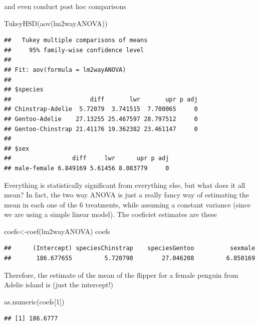 \documentclass[
]{book}
\newenvironment{Shaded}{\begin{snugshade}}{\end{snugshade}}
\newcommand{\DecValTok}[1]{\textcolor[rgb]{0.00,0.00,0.81}{#1}}
\newcommand{\FunctionTok}[1]{\textcolor[rgb]{0.00,0.00,0.00}{#1}}
\newcommand{\NormalTok}[1]{#1}
\newcommand{\OtherTok}[1]{\textcolor[rgb]{0.56,0.35,0.01}{#1}}
\begin{document}
and even conduct post hoc comparisons

\begin{Shaded}
\begin{Highlighting}[]
\FunctionTok{TukeyHSD}\NormalTok{(}\FunctionTok{aov}\NormalTok{(lm2wayANOVA))}
\end{Highlighting}
\end{Shaded}

\begin{verbatim}
##   Tukey multiple comparisons of means
##     95% family-wise confidence level
## 
## Fit: aov(formula = lm2wayANOVA)
## 
## $species
##                      diff       lwr       upr p adj
## Chinstrap-Adelie  5.72079  3.741515  7.700065     0
## Gentoo-Adelie    27.13255 25.467597 28.797512     0
## Gentoo-Chinstrap 21.41176 19.362382 23.461147     0
## 
## $sex
##                 diff     lwr      upr p adj
## male-female 6.849169 5.61456 8.083779     0
\end{verbatim}

Everything is statistically significant from everything else, but what does it all mean? In fact, the two way ANOVA is just a really fancy way of estimating the mean in each one of the 6 treatments, while assuming a constant variance (since we are using a simple linear model). The coeficiet estimates are these

\begin{Shaded}
\begin{Highlighting}[]
\NormalTok{coefs}\OtherTok{\textless{}{-}}\FunctionTok{coef}\NormalTok{(lm2wayANOVA)}
\NormalTok{coefs}
\end{Highlighting}
\end{Shaded}

\begin{verbatim}
##      (Intercept) speciesChinstrap    speciesGentoo          sexmale 
##       186.677655         5.720790        27.046208         6.850169
\end{verbatim}

Therefore, the estimate of the mean of the flipper for a female penguin from Adelie island is (just the intercept!)

\begin{Shaded}
\begin{Highlighting}[]
\FunctionTok{as.numeric}\NormalTok{(coefs[}\DecValTok{1}\NormalTok{])}
\end{Highlighting}
\end{Shaded}

\begin{verbatim}
## [1] 186.6777
\end{verbatim}
\end{document}
